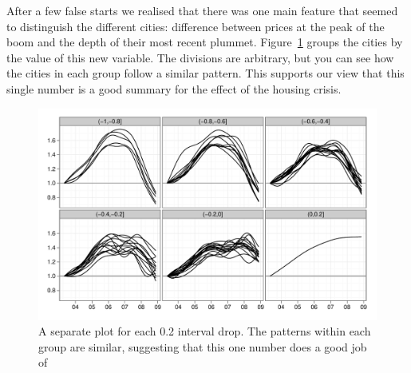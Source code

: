 \documentclass[oneside]{article}
\begin{document}
% 
% 

After a few false starts we realised that there was one main feature that seemed to distinguish the different cities: difference between prices at the peak of the boom and the depth of their most recent plummet.  Figure~\ref{fig:groups} groups the cities by the value of this new variable.  The divisions are arbitrary, but you can see how the cities in each group follow a similar pattern.  This supports our view that this single number is a good summary for the effect of the housing crisis.

\begin{figure}[htbp]
  \centering
    \includegraphics[width=0.75\linewidth]{cities-indexed-grouped}
  \caption{A separate plot for each 0.2 interval drop.  The patterns within each group are similar, suggesting that this one number does a good job of  }
  \label{fig:groups}
\end{figure}
\end{document}
